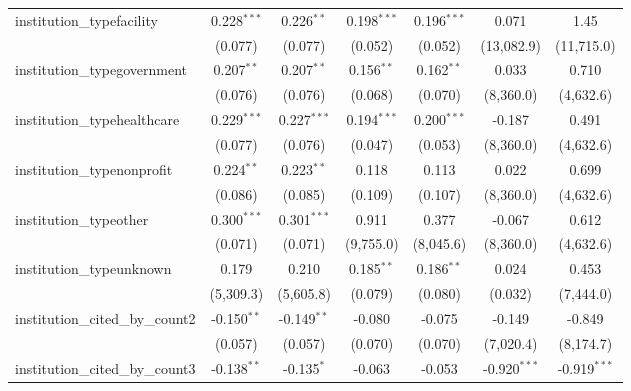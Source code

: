 \begin{tabular}{lcccccc}
   institution\_typefacility             & 0.228$^{***}$ & 0.226$^{**}$  & 0.198$^{***}$  & 0.196$^{***}$  & 0.071          & 1.45\\   
                                         & (0.077)       & (0.077)       & (0.052)        & (0.052)        & (13,082.9)     & (11,715.0)\\   
   institution\_typegovernment           & 0.207$^{**}$  & 0.207$^{**}$  & 0.156$^{**}$   & 0.162$^{**}$   & 0.033          & 0.710\\   
                                         & (0.076)       & (0.076)       & (0.068)        & (0.070)        & (8,360.0)      & (4,632.6)\\   
   institution\_typehealthcare           & 0.229$^{***}$ & 0.227$^{***}$ & 0.194$^{***}$  & 0.200$^{***}$  & -0.187         & 0.491\\   
                                         & (0.077)       & (0.076)       & (0.047)        & (0.053)        & (8,360.0)      & (4,632.6)\\   
   institution\_typenonprofit            & 0.224$^{**}$  & 0.223$^{**}$  & 0.118          & 0.113          & 0.022          & 0.699\\   
                                         & (0.086)       & (0.085)       & (0.109)        & (0.107)        & (8,360.0)      & (4,632.6)\\   
   institution\_typeother                & 0.300$^{***}$ & 0.301$^{***}$ & 0.911          & 0.377          & -0.067         & 0.612\\   
                                         & (0.071)       & (0.071)       & (9,755.0)      & (8,045.6)      & (8,360.0)      & (4,632.6)\\   
   institution\_typeunknown              & 0.179         & 0.210         & 0.185$^{**}$   & 0.186$^{**}$   & 0.024          & 0.453\\   
                                         & (5,309.3)     & (5,605.8)     & (0.079)        & (0.080)        & (0.032)        & (7,444.0)\\   
   institution\_cited\_by\_count2        & -0.150$^{**}$ & -0.149$^{**}$ & -0.080         & -0.075         & -0.149         & -0.849\\   
                                         & (0.057)       & (0.057)       & (0.070)        & (0.070)        & (7,020.4)      & (8,174.7)\\   
   institution\_cited\_by\_count3        & -0.138$^{**}$ & -0.135$^{*}$  & -0.063         & -0.053         & -0.920$^{***}$ & -0.919$^{***}$\\   

\end{tabular}
